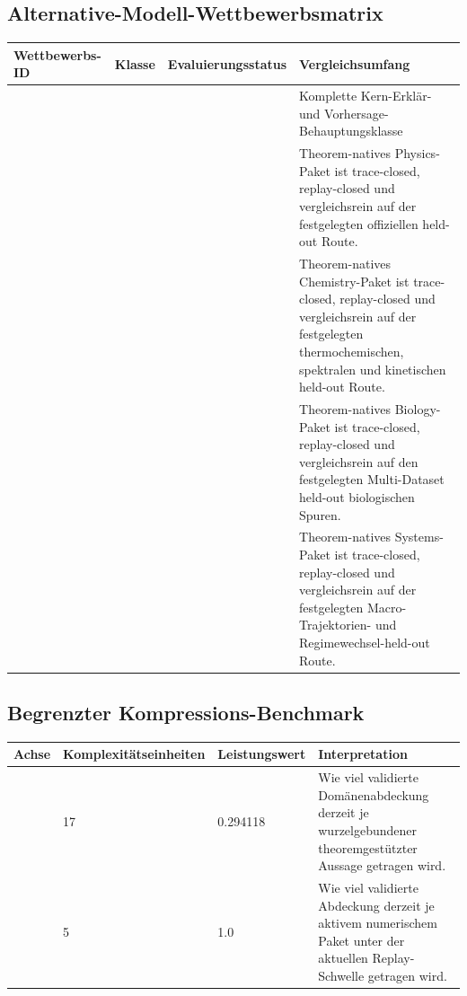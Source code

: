 \subsection{Alternative-Modell-Wettbewerbsmatrix}
\begin{center}
\begin{tabular}{@{}L{0.22\textwidth}L{0.16\textwidth}L{0.20\textwidth}L{0.34\textwidth}@{}}
\toprule
Wettbewerbs-ID & Klasse & Evaluierungsstatus & Vergleichsumfang \\
\midrule
{} &  &  & Komplette Kern-Erklär- und Vorhersage-Behauptungsklasse \\
 &  &  & Theorem-natives Physics-Paket ist trace-closed, replay-closed und vergleichsrein auf der festgelegten offiziellen held-out Route. \\
 &  &  & Theorem-natives Chemistry-Paket ist trace-closed, replay-closed und vergleichsrein auf der festgelegten thermochemischen, spektralen und kinetischen held-out Route. \\
 &  &  & Theorem-natives Biology-Paket ist trace-closed, replay-closed und vergleichsrein auf den festgelegten Multi-Dataset held-out biologischen Spuren. \\
 &  &  & Theorem-natives Systems-Paket ist trace-closed, replay-closed und vergleichsrein auf der festgelegten Macro-Trajektorien- und Regimewechsel-held-out Route. \\
\bottomrule
\end{tabular}
\end{center}

\subsection{Begrenzter Kompressions-Benchmark}
\begin{center}
\begin{tabular}{@{}L{0.24\textwidth}L{0.12\textwidth}L{0.13\textwidth}L{0.41\textwidth}@{}}
\toprule
Achse & Komplexitätseinheiten & Leistungswert & Interpretation \\
\midrule
{} & 17 & 0.294118 & Wie viel validierte Domänenabdeckung derzeit je wurzelgebundener theoremgestützter Aussage getragen wird. \\
 & 5 & 1.0 & Wie viel validierte Abdeckung derzeit je aktivem numerischem Paket unter der aktuellen Replay-Schwelle getragen wird. \\
\bottomrule
\end{tabular}
\end{center}

